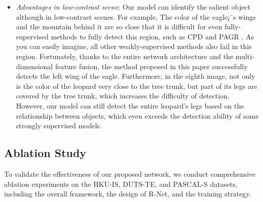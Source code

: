 \documentclass[journal]{IEEEtran}
\begin{document}
\begin{itemize}
    \item \emph{Advantages in low-contrast scene}: Our model can identify the salient object although in low-contrast scenes. For example,
    The color of the eagle¡¯s wings and the mountain behind it are so close that it is difficult for even fully-supervised methods to fully detect this region, such as CPD \cite{wu2019cascaded} and PAGR \cite{zhang2018progressive}.
    As you can easily imagine, all other weakly-supervised methods also fail in this region.
    Fortunately, thanks to the entire network architecture and the multi-dimensional feature fusion, the method proposed in this paper successfully detects the left wing of the eagle.
    Furthermore, in the eighth image, not only is the color of the leopard very close to the tree trunk, but part of its legs are covered by the tree trunk, which increases the difficulty of detection. However, our model can still detect the entire leopard's legs based on the relationship between objects, which even exceeds the detection ability of some strongly supervised models.

\end{itemize}




\subsection{Ablation Study}
To validate the effectiveness of our proposed network, we conduct comprehensive ablation experiments on the HKU-IS, DUTS-TE, and PASCAL-S datasets, including the overall framework, the design of R-Net, and the training strategy.
\end{document}

